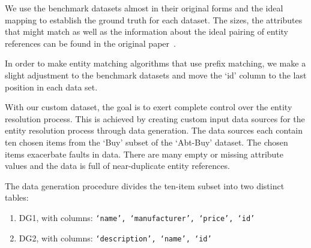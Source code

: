 

We use the benchmark datasets almost in their original forms and the ideal
mapping to establish the ground truth for each dataset.
The sizes, the attributes that might match as well as the information about the
ideal pairing of entity references can be found in the original
paper~\cite{vldb2010}.

In order to make entity matching algorithms that use prefix matching, we make a
slight adjustment to the benchmark datasets and move the `id' column to the last
position in each data set.

With our custom dataset, the goal is to exert complete control over the entity
resolution process.
This is achieved by creating custom input data sources for the entity resolution
process through data generation.
The data sources each contain ten chosen items from the `Buy' subset of the
`Abt-Buy' dataset.
The chosen items exacerbate faults in data.
There are many empty or missing attribute values and the data is full of
near-duplicate entity references.

The data generation procedure divides the ten-item subset into two distinct
tables:

\begin{enumerate}[label=\textbullet,leftmargin=1cm]
\item DG1, with columns: \texttt{`name', `manufacturer', `price', `id'}
\item DG2, with columns: \texttt{`description', `name', `id'}
\end{enumerate}

